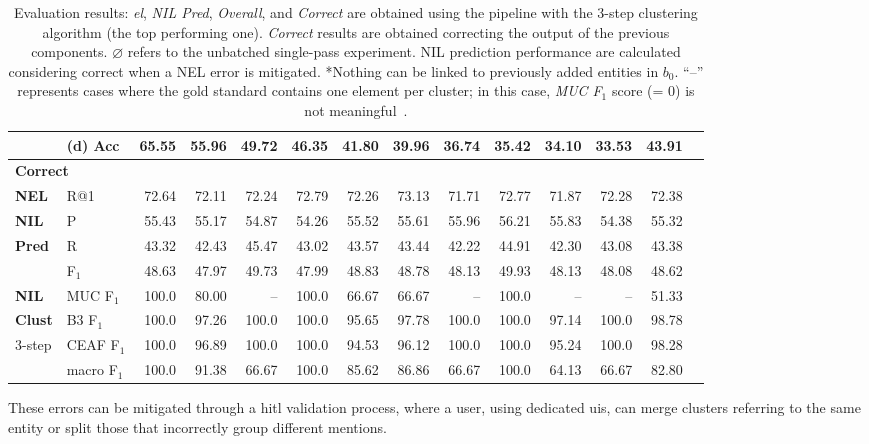 \begin{landscape}
\begin{table}
\begin{tabular}{llrrrrrrrrrrrr}
& (d) Acc &  65.55 &  55.96 &  49.72 &  46.35 &  41.80 &  39.96 &  36.74 &  35.42 &  34.10 &  33.53 &  43.91 & \\
\midrule
\hline
\multicolumn{14}{l}{\textbf{Correct}} \\
\textbf{NEL} & R@1          &   72.64 &  72.11 &   72.24 &   72.79 &  72.26 &  73.13 &   71.71 &   72.77 &  71.87 &   72.28 &  72.38 & \\
\hline
\textbf{NIL} & P            &   55.43 &  55.17 &   54.87 &   54.26 &  55.52 &  55.61 &   55.96 &   56.21 &  55.83 &   54.38 &  55.32 & \\
\textbf{Pred} & R            &   43.32 &  42.43 &   45.47 &   43.02 &  43.57 &  43.44 &   42.22 &   44.91 &  42.30 &   43.08 &  43.38 & \\
& F$_1$           &   48.63 &  47.97 &   49.73 &   47.99 &  48.83 &  48.78 &   48.13 &   49.93 &  48.13 &   48.08 &  48.62 & \\
\hline
\textbf{NIL} & MUC F$_1$       &  100.0 &  80.00 &    -- &  100.0 &  66.67 &  66.67 &    -- &  100.0 &   -- &    -- &  51.33 & \\
\textbf{Clust} & B3 F$_1$        &  100.0 &  97.26 &  100.0 &  100.0 &  95.65 &  97.78 &  100.0 &  100.0 &  97.14 &  100.0 &  98.78 & \\
3-step & CEAF F$_1$      &  100.0 &  96.89 &  100.0 &  100.0 &  94.53 &  96.12 &  100.0 &  100.0 &  95.24 &  100.0 &  98.28 & \\
& macro F$_1$       &  100.0 &  91.38 &   66.67 &  100.0 &  85.62 &  86.86 &   66.67 &  100.0 &  64.13 &   66.67 &  82.80 & \\
\bottomrule
\end{tabular}
    \caption{Evaluation results: \textit{\ac{el}}, \textit{NIL Pred}, \textit{Overall}, and \textit{Correct} are obtained using the pipeline with the 3-step clustering algorithm (the top performing one). \textit{Correct} results are obtained correcting the output of the previous components. $\varnothing$ refers to the unbatched single-pass experiment. NIL prediction performance are calculated considering correct when a NEL error is mitigated. *Nothing can be linked to previously added entities in $b_{0}$. ``--'' represents cases where the gold standard contains one element per cluster; in this case, \textit{MUC F$_1$} score (= 0) is not meaningful~\cite{recasens_hovy_2011}.}
    \label{tab:superresults}
\end{table}
\end{landscape}

These errors can be mitigated through a \acl{hitl} validation process, where a user, using dedicated \acp{ui}, can merge clusters referring to the same entity or split those that incorrectly group different mentions.



